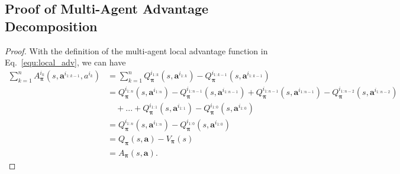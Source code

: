 \documentclass[11pt]{article}
\theoremstyle{plain}
\theoremstyle{remark}
\begin{document}
\subsection{Proof of Multi-Agent Advantage Decomposition}
\label{appendix:a-1}
\begin{proof}
With the definition of the multi-agent local advantage function in Eq.~\eqref{equ:local_adv}, we can have 
\begin{align*}
    \sum_{k=1}^{n}A_{\boldsymbol{\pi}}^{i_{k}} (s, \boldsymbol{a}^{i_{1:k-1}}, a^{i_k}) &= \sum_{k=1}^{n}Q_{\boldsymbol{\pi}}^{i_{1:k}}(s, \boldsymbol{a}^{i_{1:k}}) - Q_{\boldsymbol{\pi}}^{i_{1:k-1}}(s, \boldsymbol{a}^{i_{1:k-1}}) \\
    &= Q_{\boldsymbol{\pi}}^{i_{1:n}}(s, \boldsymbol{a}^{i_{1:n}}) - Q_{\boldsymbol{\pi}}^{i_{1:n-1}}(s, \boldsymbol{a}^{i_{1:n-1}}) + Q_{\boldsymbol{\pi}}^{i_{1:n-1}}(s, \boldsymbol{a}^{i_{1:n-1}}) - Q_{\boldsymbol{\pi}}^{i_{1:n-2}}(s, \boldsymbol{a}^{i_{1:n-2}}) \\
    & \quad + ... + Q_{\boldsymbol{\pi}}^{i_{1:1}}(s, \boldsymbol{a}^{i_{1:1}}) - Q_{\boldsymbol{\pi}}^{i_{1:0}}(s, \boldsymbol{a}^{i_{1:0}}) \\
    &= Q_{\boldsymbol{\pi}}^{i_{1:n}}(s, \boldsymbol{a}^{i_{1:n}}) - Q_{\boldsymbol{\pi}}^{i_{1:0}}(s, \boldsymbol{a}^{i_{1:0}})\\
    &= Q_{\boldsymbol{\pi}}(s, \boldsymbol{a}) - V_{\boldsymbol{\pi}}(s) \\
    &= A_{\boldsymbol{\pi}}(s, \boldsymbol{a}).
\end{align*}
\end{proof}
\end{document}

